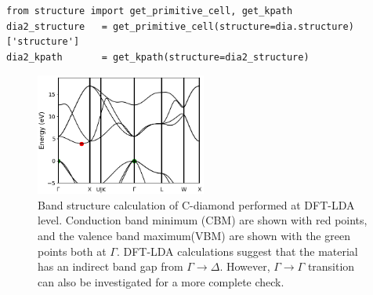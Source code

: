 \begin{lstlisting}
from structure import get_primitive_cell, get_kpath
dia2_structure   = get_primitive_cell(structure=dia.structure)['structure']
dia2_kpath       = get_kpath(structure=dia2_structure)
\end{lstlisting}

\begin{figure}
	\centering
	\includegraphics[width=0.5\textwidth]{figures/lab_excited_band_si}
	\caption{Band structure calculation of C-diamond performed at DFT-LDA level. Conduction band minimum (CBM) are shown with red points, and the valence band maximum(VBM)  are shown with the green points both at $\Gamma$.  DFT-LDA calculations suggest that the material has an indirect band gap from $\Gamma\rightarrow{\Delta}$. However, $\Gamma\rightarrow{\Gamma}$ transition can also be investigated for a more complete check. }
	\label{fig:lab5_bands}
\end{figure}

